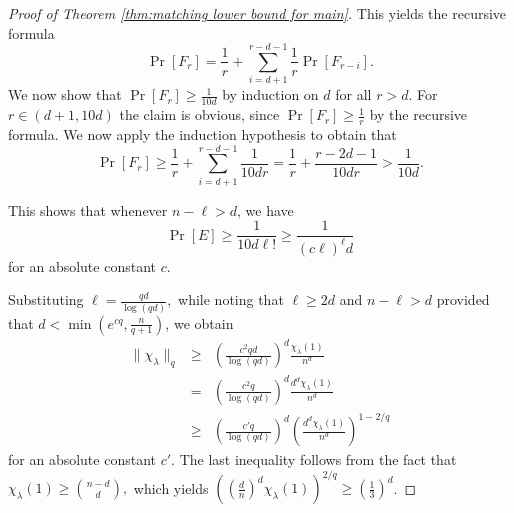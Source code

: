 \documentclass[10pt,a4paper]{amsart}
\renewcommand\ge{\geqslant}
\begin{document}
\begin{proof}[Proof of Theorem \ref{thm:matching lower bound for main}]
{This yields the recursive formula \[ \Pr[F_r] = \frac{1}{r} + \sum_{i=d+1}^{r-d-1}\frac{1}{r}\Pr[F_{r-i}].\]
We now show that $\Pr[F_r]\ge \frac{1}{10d}$ by induction on $d$ for all $r> d$. For $r \in (d+1,10 d)$ the claim is obvious, since $\Pr[F_r] \ge \frac{1}{r}$ by the recursive formula. We now apply the induction hypothesis to obtain that %
\[
    \Pr[F_r]\ge \frac{1}{r} + \sum_{i=d+1}^{r-d-1} \frac{1}{10dr} = \frac{1}{r}+\frac{r-2d-1}{10dr}>\frac{1}{10 d}.
\]

This shows that whenever $n-\ell >d$, we have 
\[\Pr[E]\ge \frac{1}{10d \ell!} \ge \frac{1}{ (c\ell)^\ell d}\]
for an absolute constant $c$.}
Substituting $\ell=\frac{qd}{\log (qd)},$ while noting that $\ell\ge 2d$ and $n - \ell > d$ provided that $d < \min(e^{cq},\frac{n}{q+1})$, we obtain  
\begin{eqnarray*}
\|\chi_{\lambda}\|_q 
&\ge& \left(\frac{c^2qd}{\log (qd)}\right)^d\frac{\chi_\lambda(1)}{n^{d}} \\
&=& \left(\frac{c^2q}{\log(qd)}\right)^d\frac{d^d\chi_{\lambda}(1)}{n^d} \\
&\ge& \left(\frac{c'q}{\log(qd)}\right)^d \left(\frac{d^d\chi_{\lambda}(1)}{n^d}\right)^{1-2/q}
\end{eqnarray*}
for an absolute constant $c'$. The last inequality follows from the fact that $\chi_\lambda(1) \ge \binom{n-d}{d},$ which yields
$\left(\left(\frac{d}{n}\right)^d\chi_{\lambda}(1)\right)^{2/q} \ge \left(\frac{1}{3}\right)^{d}$.
\end{proof}
\end{document}
